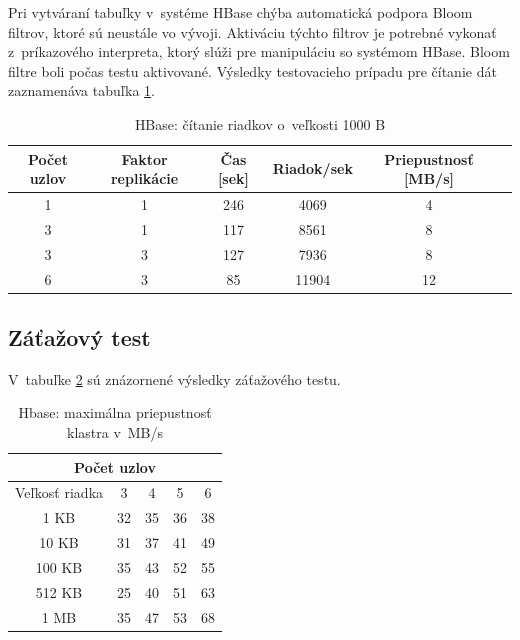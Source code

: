 \documentclass[11pt,twoside,a4paper]{book}
\begin{document}
Pri vytváraní tabuľky v~systéme HBase chýba automatická podpora Bloom filtrov, ktoré sú neustále vo vývoji. Aktiváciu týchto filtrov je potrebné vykonať z~príkazového interpreta, ktorý slúži pre manipuláciu so systémom HBase. Bloom filtre boli počas testu aktivované. Výsledky testovacieho prípadu pre čítanie dát zaznamenáva tabuľka \ref{tab:HPerf2}.

\begin{table}[hp]
\begin{center}
\begin{tabular}{|c|c|c|c|c|c|}

\hline Počet uzlov & Faktor replikácie & Čas [sek] & Riadok/sek & Priepustnosť [MB/s]\\ 
\hline
\hline 1 & 1 & 246 & 4069 & 4\\ 
\hline 3 & 1 & 117 & 8561 & 8\\ 
\hline 3 & 3 & 127 & 7936 & 8\\ 
\hline 6 & 3 & 85 & 11904 & 12\\ 
\hline
\end{tabular} 
\end{center}
\caption{HBase: čítanie riadkov o~veľkosti 1000 B}
\label{tab:HPerf2}
\end{table}

\subsection*{Záťažový test}

V~tabuľke \ref{tab:HPerf3} sú znázornené výsledky záťažového testu.

\begin{table}[htp]
\begin{center}
\begin{tabular}{|c|c|c|c|c|}
\hline
\multicolumn{5}{|c|}{Počet uzlov}  \\
\hline Veľkosť riadka & 3 & 4 & 5 & 6\\ 
\hline
\hline 1 KB & 32 & 35 & 36 & 38\\ 
\hline 10 KB & 31 & 37 & 41 & 49 \\ 
\hline 100 KB & 35 & 43 & 52 & 55\\ 
\hline 512 KB & 25 & 40 & 51 & 63 \\  
\hline 1 MB & 35 & 47 & 53 & 68 \\ 
\hline
\end{tabular} 
\end{center}
\caption{Hbase: maximálna priepustnosť klastra v~MB/s}
\label{tab:HPerf3}
\end{table}
\end{document}
